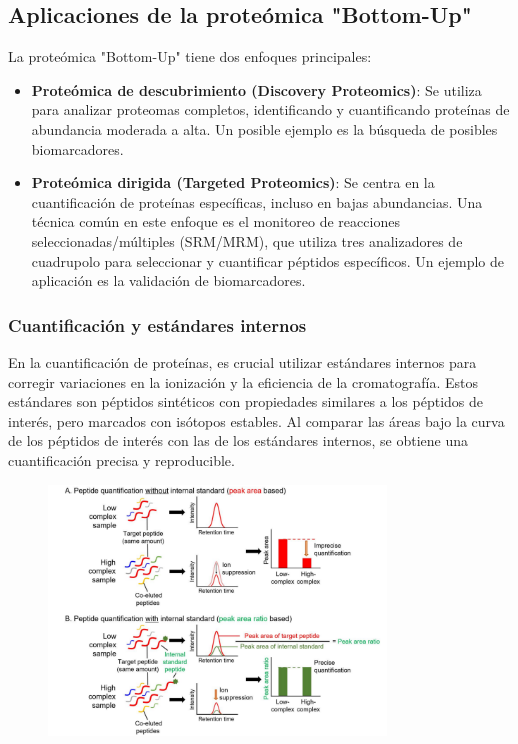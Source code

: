 \subsection{Aplicaciones de la proteómica "Bottom-Up"}
La proteómica "Bottom-Up" tiene dos enfoques principales:
\begin{itemize}
\item \textbf{Proteómica de descubrimiento (Discovery Proteomics)}: Se utiliza para analizar proteomas completos, identificando y cuantificando proteínas de abundancia moderada a alta. Un posible ejemplo es la búsqueda de posibles biomarcadores.
\item \textbf{Proteómica dirigida (Targeted Proteomics)}: Se centra en la cuantificación de proteínas específicas, incluso en bajas abundancias. Una técnica común en este enfoque es el monitoreo de reacciones seleccionadas/múltiples (SRM/MRM), que utiliza tres analizadores de cuadrupolo para seleccionar y cuantificar péptidos específicos. Un ejemplo de aplicación es la validación de biomarcadores.
\end{itemize}

\subsubsection{Cuantificación y estándares internos}
En la cuantificación de proteínas, es crucial utilizar estándares internos para corregir variaciones en la ionización y la eficiencia de la cromatografía. Estos estándares son péptidos sintéticos con propiedades similares a los péptidos de interés, pero marcados con isótopos estables. Al comparar las áreas bajo la curva de los péptidos de interés con las de los estándares internos, se obtiene una cuantificación precisa y reproducible.

\begin{figure}[h]
\centering
\includegraphics[width = 0.8\textwidth]{figs/internal-standard.png}
\end{figure}

